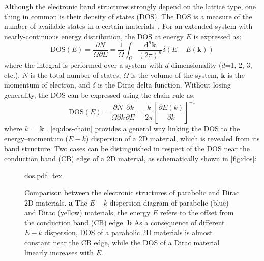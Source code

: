 Although the electronic band structures strongly depend on the lattice
type, one thing in common is their density of states (DOS). The DOS is
a measure of the number of available states in a certain
materials~\autocite{Kittel_2005_introduction_book}. For an extended system
with nearly-continuous energy distribution, the DOS at energy $E$ is
expressed as\autocite{Kittel_2005_introduction_book}:
\begin{equation}
  \label{eq:ch-intro-dos}
  \mathrm{DOS}(E) = \frac{\partial N}{\Omega \partial E} =  \frac{1}{\Omega} {\displaystyle \int_{\Omega}} \frac{\mathrm{d}^{n} \mathbf{k}}{(2 \pi)^{n}}
  \delta(E - E(\mathbf{k}))
\end{equation}
where the integral is performed over a system with $d$-dimensionality
($d$=1, 2, 3, etc.), $N$ is the total number of states, $\Omega$ is
the volume of the system, $\mathbf{k}$ is the momentum of electron,
and $\delta$ is the Dirac delta function. Without losing generality,
the DOS can be expressed using the chain rule as:
\begin{equation}
  \label{eq:dos-chain}
  \mathrm{DOS}(E) = \frac{\partial N}{\Omega \partial k} \frac{\partial k}{\partial E}
               = \frac{k}{2 \pi} \left[\frac{\partial E(k)}{\partial k}\right]^{-1}
\end{equation}
where $k=|\mathbf{k}|$.
%
\autoref{eq:dos-chain} provides a general way linking the DOS to the
energy--momentum ($E-k$) dispersion of a 2D material, which is revealed from its band structure.  Two
cases can be distinguished in respect of the DOS near the conduction band
(CB) edge of a 2D material, as schematically shown in \autoref{fig:dos}:
\begin{figure}[h]
  \centering
  {dos.pdf_tex}
  \caption{\label{fig:dos}%
    Comparison between the electronic structures of parabolic and
    Dirac 2D materials. \textbf{a} The $E-k$ dispersion diagram of
    parabolic (blue) and Dirac (yellow) materials, the energy $E$
    refers to the offset from the conduction band (CB) edge.
    \textbf{b} As a consequence of different $E-k$ dispersion, DOS of
    a parabolic 2D materials is almost constant near the CB edge,
    while the DOS of a Dirac material linearly increases with $E$.  %
  }
\end{figure}

